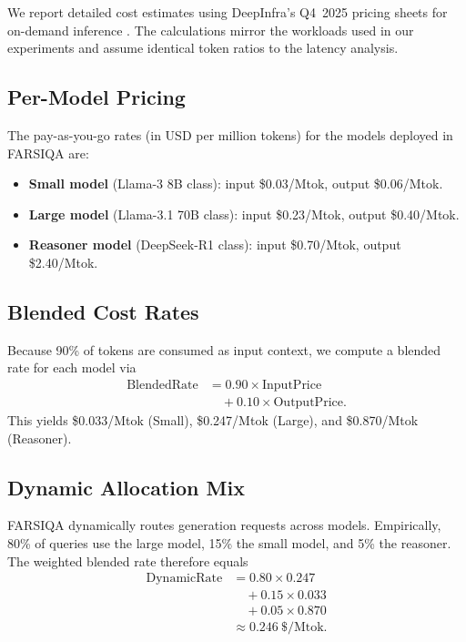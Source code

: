 \documentclass[11pt]{article}
\begin{document}
We report detailed cost estimates using DeepInfra's Q4~2025 pricing sheets for on-demand inference \cite{DeepInfraPricing2025}. The calculations mirror the workloads used in our experiments and assume identical token ratios to the latency analysis.

\subsection{Per-Model Pricing}

The pay-as-you-go rates (in USD per million tokens) for the models deployed in FARSIQA are:
\begin{itemize}
  \item \textbf{Small model} (Llama-3 8B class): input \$0.03/Mtok, output \$0.06/Mtok.
  \item \textbf{Large model} (Llama-3.1 70B class): input \$0.23/Mtok, output \$0.40/Mtok.
  \item \textbf{Reasoner model} (DeepSeek-R1 class): input \$0.70/Mtok, output \$2.40/Mtok.
\end{itemize}

\subsection{Blended Cost Rates}

Because 90\% of tokens are consumed as input context, we compute a blended rate for each model via
\begin{align}
    \text{BlendedRate} &= 0.90 \times \text{InputPrice} \nonumber \\
                       &\quad+ 0.10 \times \text{OutputPrice}.
\end{align}
This yields \$0.033/Mtok (Small), \$0.247/Mtok (Large), and \$0.870/Mtok (Reasoner).

\subsection{Dynamic Allocation Mix}

FARSIQA dynamically routes generation requests across models. Empirically, 80\% of queries use the large model, 15\% the small model, and 5\% the reasoner. The weighted blended rate therefore equals
\begin{align}
  	\text{DynamicRate} &= 0.80 \times 0.247 \nonumber \\
                     &\quad+ 0.15 \times 0.033 \nonumber \\
                     &\quad+ 0.05 \times 0.870 \label{eq:dynamic-rate} \\
                     &\approx 0.246~\$/\text{Mtok}. \nonumber
\end{align}
\end{document}
